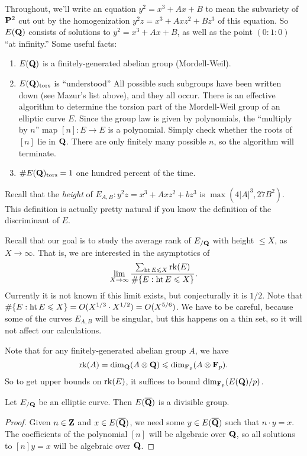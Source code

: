Throughout, we'll write an equation $y^2=x^3+A x+B$ to mean the subvariety of 
$\mathbf{P}^2$ cut out by the homogenization $y^2 z=x^3+A x z^2+B z^3$ of this 
equation. So $E(\mathbf{Q})$ consists of solutions to $y^2=x^3+A x+B$, as well as the 
point $(0:1:0)$ ``at infinity.'' Some useful facts:
\begin{enumerate}
\item
$E(\mathbf{Q})$ is a finitely-generated abelian group (Mordell-Weil). 

\item
$E(\mathbf{Q})_\mathrm{tors}$ is ``understood'' All possible such 
subgroups have been written down (see Mazur's list above), and they all 
occur. There is an effective algorithm to determine the torsion part of the 
Mordell-Weil group of an elliptic curve $E$. Since the group law is given by 
polynomials, the ``multiply by $n$'' map $[n]:E\to E$ is a polynomial. 
Simply check whether the roots of $[n]$ lie in $\mathbf{Q}$. There are only finitely 
many possible $n$, so the algorithm will terminate. 

\item
$\#E(\mathbf{Q})_\mathrm{tors}=1$ one hundred percent of the time. 
\end{enumerate}

Recall that the \emph{height} of $E_{A,B}:y^2 z=x^3+A x z^2+b z^3$ is 
$\max(4|A|^3,27 B^2)$. This definition is actually 
pretty natural if you know the definition of the discriminant of $E$. 

Recall that our goal is to study the average rank of $E_{/\mathbf{Q}}$ with height 
$\leqslant X$, as $X\to \infty$. That is, we are interested in the asymptotics 
of 
\[
  \lim_{X\to \infty} \frac{\sum_{\operatorname{ht} E\leqslant X} \operatorname{rk}(E)}{\#\{E:\operatorname{ht} E\leqslant X\}} .
\]
Currently it is not known if this limit exists, but conjecturally it is $1/2$. 
Note that $\#\{E:\operatorname{ht} E\leqslant X\}=O(X^{1/3}\cdot X^{1/2})=O(X^{5/6})$. We 
have to be careful, because some of the curves $E_{A,B}$ will be singular, but 
this happens on a thin set, so it will not affect our calculations. 

Note that for any finitely-generated abelian group $A$, we have 
\[
  \operatorname{rk}(A) = \dim_{\mathbf{Q}}(A\otimes\mathbf{Q}) \leqslant \dim_{\mathbf{F}_p}(A\otimes\mathbf{F}_p) .
\]
So to get upper bounds on $\operatorname{rk}(E)$, it suffices to bound 
$\dim_{\mathbf{F}_p}(E(\mathbf{Q})/p)$. 

\begin{theorem}
Let $E_{/\mathbf{Q}}$ be an elliptic curve. Then $E(\overline{\mathbf{Q}})$ is a divisible 
group. 
\end{theorem}
\begin{proof}
Given $n\in \mathbf{Z}$ and $x\in E(\overline{\mathbf{Q}})$, we need some $y\in E(\overline{\mathbf{Q}})$ 
such that $n\cdot y=x$. The coefficients of the polynomial $[n]$ will be 
algebraic over $\mathbf{Q}$, so all solutions to $[n] y=x$ will be algebraic over $\mathbf{Q}$. 
\end{proof}

